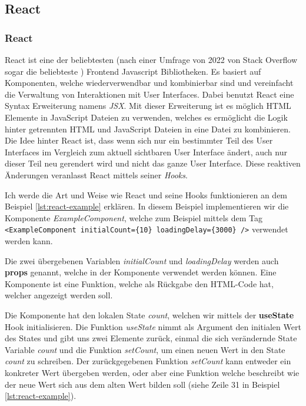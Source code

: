 \documentclass[a4paper,12pt]{report}
\begin{document}
        \subsection{React}
        \subsubsection{React}
        \label{sec:react}
React ist eine der beliebtesten (nach einer Umfrage von 2022 von Stack Overflow sogar die beliebteste \cite{stack-overflow-survey}) Frontend Javascript Bibliotheken. Es basiert auf Komponenten, welche wiederverwendbar und kombinierbar sind und vereinfacht die Verwaltung von Interaktionen mit User Interfaces. Dabei benutzt React eine Syntax Erweiterung namens \textit{JSX}. Mit dieser Erweiterung ist es möglich HTML Elemente in JavaScript Dateien zu verwenden, welches es ermöglicht die Logik hinter getrennten HTML und JavaScript Dateien in eine Datei zu kombinieren. Die Idee hinter React ist, dass wenn sich nur ein bestimmter Teil des User Interfaces im Vergleich zum aktuell sichtbaren User Interface ändert, auch nur dieser Teil neu gerendert wird und nicht das ganze User Interface. Diese reaktiven Änderungen veranlasst React mittels seiner \textit{Hooks}.

Ich werde die Art und Weise wie React und seine Hooks funktionieren an dem Beispiel \ref{lst:react-example} erklären.
In diesem Beispiel implementieren wir die Komponente \textit{ExampleComponent}, welche zum Beispiel mittels dem Tag \verb|<ExampleComponent initialCount={10} loadingDelay={3000} />| verwendet werden kann. 

Die zwei übergebenen Variablen \textit{initialCount} und \textit{loadingDelay} werden auch \textbf{props} genannt, welche in der Komponente verwendet werden können. Eine Komponente ist eine Funktion, welche als Rückgabe den HTML-Code hat, welcher angezeigt werden soll.

Die Komponente hat den lokalen State \textit{count}, welchen wir mittels der \textbf{useState} Hook initialisieren. Die Funktion \textit{useState} nimmt als Argument den initialen Wert des States und gibt uns zwei Elemente zurück, einmal die sich verändernde State Variable \textit{count} und die Funktion \textit{setCount}, um einen neuen Wert in den State \textit{count} zu schreiben. Der zurückgegebenen Funktion \textit{setCount} kann entweder ein konkreter Wert übergeben werden, oder aber eine Funktion welche beschreibt wie der neue Wert sich aus dem alten Wert bilden soll (siehe Zeile 31 in Beispiel \ref{lst:react-example}).
\end{document}
